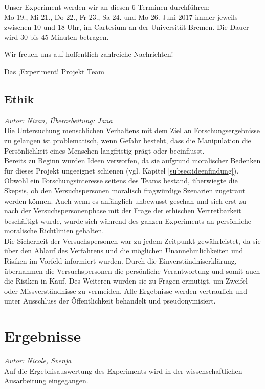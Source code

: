 \documentclass{Bericht}
\begin{document}
Unser Experiment werden wir an diesen 6 Terminen durchführen: \\

Mo 19., Mi 21., Do 22., Fr 23., Sa 24. und Mo 26. Juni 2017 immer jeweils zwischen 10 und 18 Uhr, im Cartesium an der Universität Bremen. Die Dauer wird 30 bis 45 Minuten betragen.

Wir freuen uns auf hoffentlich zahlreiche Nachrichten!

Das ¡Experiment! Projekt Team
\par 
\endgroup


\subsection{Ethik}
\textit{Autor: Nizan, Überarbeitung: Jana}\\
Die Untersuchung menschlichen Verhaltens mit dem Ziel an Forschungsergebnisse zu gelangen ist problematisch, wenn Gefahr besteht, dass die Manipulation die Persönlichkeit eines Menschen langfristig prägt oder beeinflusst.\\
 Bereits zu Beginn wurden Ideen verworfen, da sie aufgrund moralischer Bedenken für dieses Projekt ungeeignet schienen (vgl. Kapitel \ref{subsec:ideenfindung}). Obwohl ein Forschungsinteresse seitens des Teams bestand, überwiegte die Skepsis, ob den Versuchspersonen moralisch fragwürdige Szenarien zugetraut werden können. Auch wenn es anfänglich unbewusst geschah und sich erst zu nach der Versuchspersonenphase mit der Frage der ethischen Vertretbarkeit beschäftigt wurde, wurde sich während des ganzen Experiments an persönliche moralische Richtlinien gehalten. \\
Die Sicherheit der Versuchspersonen war zu jedem Zeitpunkt gewährleistet, da sie über den Ablauf des Verfahrens und die möglichen Unannehmlichkeiten und Risiken im Vorfeld informiert wurden. Durch die Einverständniserklärung, übernahmen die Versuchspersonen die persönliche Verantwortung und somit auch die Risiken in Kauf. Des Weiteren wurden sie zu Fragen ermutigt, um Zweifel oder Missverständnisse zu vermeiden. Alle Ergebnisse werden vertraulich und unter Ausschluss der Öffentlichkeit behandelt und pseudonymisiert.

\section{Ergebnisse}
\textit{Autor: Nicole, Svenja}\\
Auf die Ergebnisauswertung des Experiments wird in der wissenschaftlichen Ausarbeitung eingegangen.
\end{document}
